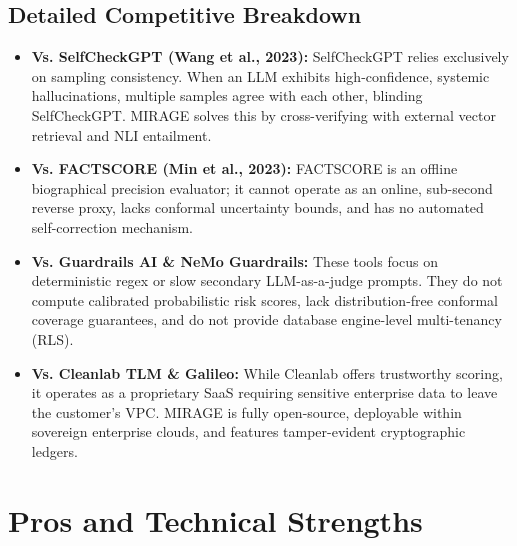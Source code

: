 \documentclass[11pt,a4paper]{article}
\begin{document}
\subsection{Detailed Competitive Breakdown}
\begin{itemize}[leftmargin=*]
    \item \textbf{Vs. SelfCheckGPT (Wang et al., 2023):} SelfCheckGPT relies exclusively on sampling consistency. When an LLM exhibits high-confidence, systemic hallucinations, multiple samples agree with each other, blinding SelfCheckGPT. MIRAGE solves this by cross-verifying with external vector retrieval and NLI entailment.
    \item \textbf{Vs. FACTSCORE (Min et al., 2023):} FACTSCORE is an offline biographical precision evaluator; it cannot operate as an online, sub-second reverse proxy, lacks conformal uncertainty bounds, and has no automated self-correction mechanism.
    \item \textbf{Vs. Guardrails AI \& NeMo Guardrails:} These tools focus on deterministic regex or slow secondary LLM-as-a-judge prompts. They do not compute calibrated probabilistic risk scores, lack distribution-free conformal coverage guarantees, and do not provide database engine-level multi-tenancy (RLS).
    \item \textbf{Vs. Cleanlab TLM \& Galileo:} While Cleanlab offers trustworthy scoring, it operates as a proprietary SaaS requiring sensitive enterprise data to leave the customer's VPC. MIRAGE is fully open-source, deployable within sovereign enterprise clouds, and features tamper-evident cryptographic ledgers.
\end{itemize}

\section{Pros and Technical Strengths}
\end{document}
